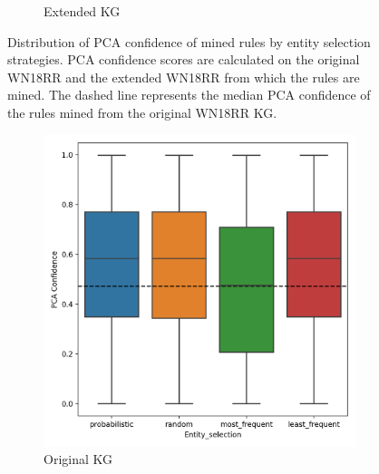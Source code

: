 \begin{figure}[htbp]
\begin{subfigure}{.5\textwidth}
  \caption{Extended KG}
  \label{fig:_PCA_entity_wn18rr_boxplot_sub}
\end{subfigure}
\caption[Dist. of PCA conf. of rules by entity selection strategies - WN18RR KG.]{Distribution of PCA confidence of mined rules by entity selection strategies. PCA confidence scores are calculated on the original WN18RR and the extended WN18RR from which the rules are mined. The dashed line represents the median PCA confidence of the rules mined from the original WN18RR KG.}
\label{fig:PCA_entity_wn18rr_boxplot}
\end{figure}

\begin{figure}[htbp]
\centering
\begin{subfigure}{.5\textwidth}
  \centering
  \includegraphics[width=1\linewidth]{figures/results/entity_selection/PCA-entity_family.png}
  \caption{Original KG}
  \label{fig:models_entity_boxplot_sub}
\end{subfigure}%
\begin{subfigure}{.5\textwidth}
  \centering

\end{subfigure}
\end{figure}
